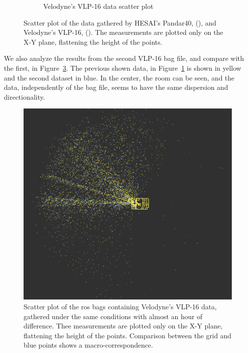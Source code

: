 \begin{figure}[ht!]
\begin{subfigure}[t]{0.45\textwidth}
	\caption{Velodyne's VLP-16 data scatter plot}
	\label{fig:bosch-vlp16-1}
\end{subfigure}
\caption[Scatter plot top-view of both \acp{lidar} interference on the dataset provided by Bosch.]{Scatter plot of the data gathered by HESAI's Pandar40, (), and Velodyne's VLP-16, (). The measurements are plotted only on the X-Y plane, flattening the height of the points.}
\label{fig:bosch-pandar-vs-vlp16}
\end{figure}

We also analyze the results from the second VLP-16 bag file, and compare with the first, in Figure~\ref{fig:bosch-vlp16-comparison}. The previous shown data, in Figure~\ref{fig:bosch-vlp16-1} is shown in yellow and the second dataset in blue. In the center, the room can be seen, and the data, independently of the bag file, seems to have the same dispersion and directionality.

\begin{figure}[ht!]
\centering
\includegraphics[scale=0.33]{img/bosch/vlp16-tests-overlaid.png}
\caption[Scattered plot of VLP-16 interference taken on two different instants, on the same conditions.]{Scatter plot of the \ac{ros} bags containing Velodyne's VLP-16 data, gathered under the same conditions with almost an hour of difference. Thee measurements are plotted only on the X-Y plane, flattening the height of the points. Comparison between the grid and blue points shows a macro-correspondence.}
\label{fig:bosch-vlp16-comparison}
\end{figure}

